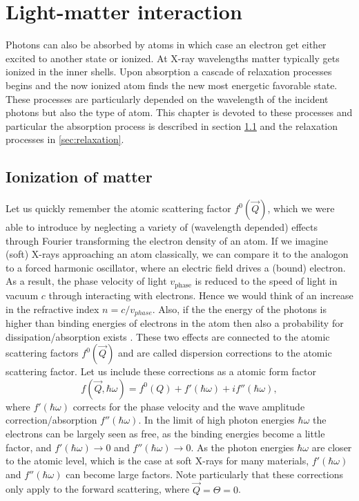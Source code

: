 \section{Light-matter interaction}
Photons can also be absorbed by atoms in which case an electron get either excited to another state or ionized. At X-ray wavelengths matter typically gets ionized in the inner shells. Upon absorption a cascade of relaxation processes begins and the now ionized atom finds the new most energetic favorable state. These processes are particularly depended on the wavelength of the incident photons but also the type of atom. This chapter is devoted to these processes and particular the absorption process is described in section \ref{sec:absorption} and the relaxation processes in \ref{sec:relaxation}.
\subsection{Ionization of matter}\label{sec:absorption}
Let us quickly remember the atomic scattering factor $f^{0}\left(\vec{Q}\right)$, which we were able to introduce by neglecting a variety of (wavelength depended) effects through Fourier transforming the electron density of an atom. If we imagine (soft) X-rays approaching an atom classically, we can compare it to the analogon to a forced harmonic oscillator, where an electric field drives a (bound) electron. As a result, the phase velocity of light $v_{\text{phase}}$ is reduced to the speed of light in vacuum $c$ through interacting with electrons. Hence we would think of an increase in the refractive index $n=c/v_{phase}$. Also, if the the energy of the photons is higher than binding energies of electrons in the atom then also a probability for dissipation/absorption exists \citep{Als-Nielson-2011-JWS,Attwood-2007-CUP}. These two effects are connected to the atomic scattering factors $f^{0}\left(\vec{Q}\right)$ and are called dispersion corrections to the atomic scattering factor. Let us include these corrections as a atomic form factor
\begin{equation}
f\left(\vec{Q},\hbar\omega\right)=f^{0}\left(Q\right)+f'\left(\hbar\omega\right)+i f''\left(\hbar\omega\right),
\label{eq:scattering-factor-dispersion-corr}
\end{equation}
where $f'\left(\hbar\omega\right)$ corrects for the phase velocity and the wave amplitude correction/absorption $f''\left(\hbar\omega\right)$. In the limit of high photon energies $\hbar \omega$ the electrons can be largely seen as free, as the binding energies become a little factor, and $f'\left(\hbar\omega\right)\rightarrow 0$ and $f''\left(\hbar\omega\right)\rightarrow 0$. As the photon energies $\hbar \omega$ are closer to the atomic level, which is the case at soft X-rays for many materials, $f'\left(\hbar\omega\right)$ and $f''\left(\hbar\omega\right)$ can become large factors. Note particularly that these corrections only apply to the forward scattering, where $\vec{Q}=\Theta=0$.\\

